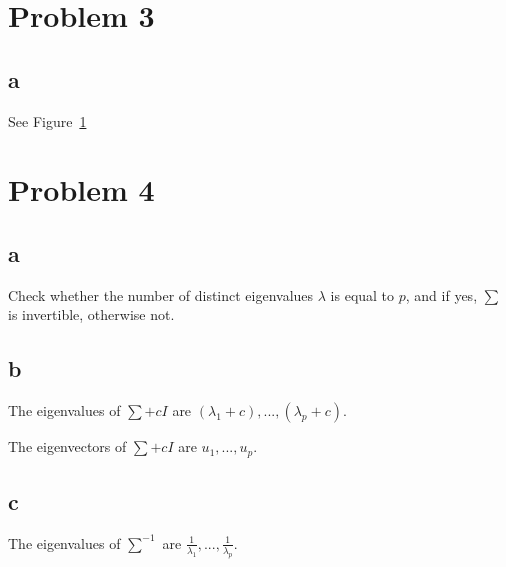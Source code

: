 \documentclass[a4paper,11pt]{article}
\theoremstyle{mytheor}
\begin{document}
\section*{Problem 3}
\subsection*{a}
See Figure~\ref{fig:3}
\begin{figure}[t]
	\label{fig:3}
\end{figure}

\section*{Problem 4}
\subsection*{a}
Check whether the number of distinct eigenvalues $\lambda$ is equal to $p$, and
if yes, $\sum$ is invertible, otherwise not.

\subsection*{b}
The eigenvalues of $\sum + c I$ are $(\lambda_1 + c), ... , (\lambda_p + c)$.

The eigenvectors of $\sum + c I$ are $u_1, ..., u_p$.

\subsection*{c}
The eigenvalues of $\sum^{-1}$ are $\frac{1}{\lambda_1}, ... , \frac{1}{\lambda_p} $.
\end{document}
